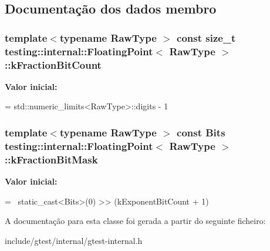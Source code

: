 \subsection{Documentação dos dados membro}
\hypertarget{classtesting_1_1internal_1_1FloatingPoint_a0b756a6d2a4f5f5b41ca79651c06c043}{
\subsubsection[{k\-Fraction\-Bit\-Count}]{\setlength{\rightskip}{0pt plus 5cm}template$<$typename Raw\-Type $>$ const size\-\_\-t {\bf testing\-::internal\-::\-Floating\-Point}$<$ Raw\-Type $>$\-::k\-Fraction\-Bit\-Count\hspace{0.3cm}{\ttfamily [static]}}}\label{classtesting_1_1internal_1_1FloatingPoint_a0b756a6d2a4f5f5b41ca79651c06c043}
{\bfseries Valor inicial\-:}
\begin{DoxyCode}
=
    std::numeric\_limits<RawType>::digits - 1
\end{DoxyCode}
\hypertarget{classtesting_1_1internal_1_1FloatingPoint_a0ac75d4ffd24f14bca452abe8a718da1}{
\subsubsection[{k\-Fraction\-Bit\-Mask}]{\setlength{\rightskip}{0pt plus 5cm}template$<$typename Raw\-Type $>$ const Bits {\bf testing\-::internal\-::\-Floating\-Point}$<$ Raw\-Type $>$\-::k\-Fraction\-Bit\-Mask\hspace{0.3cm}{\ttfamily [static]}}}\label{classtesting_1_1internal_1_1FloatingPoint_a0ac75d4ffd24f14bca452abe8a718da1}
{\bfseries Valor inicial\-:}
\begin{DoxyCode}
=
    ~static\_cast<Bits>(0) >> (kExponentBitCount + 1)
\end{DoxyCode}


A documentação para esta classe foi gerada a partir do seguinte ficheiro\-:\begin{DoxyCompactItemize}
\item 
include/gtest/internal/gtest-\/internal.\-h\end{DoxyCompactItemize}
